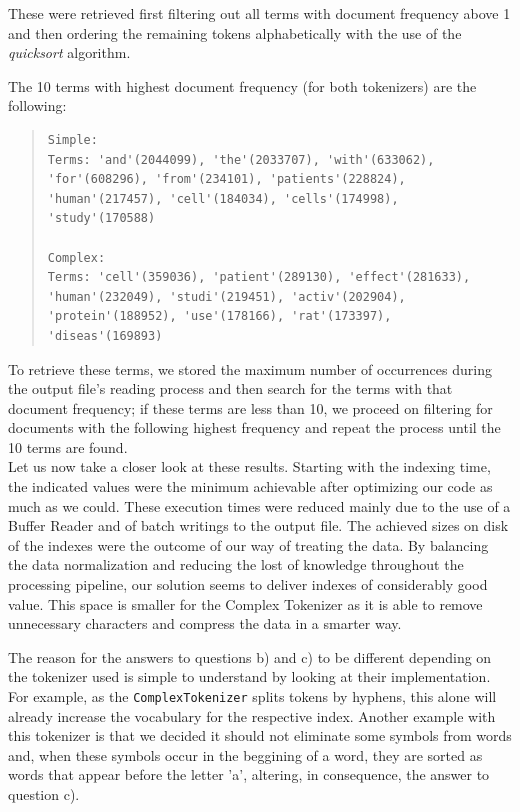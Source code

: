 \documentclass[12pt]{article}
\begin{document}
These were retrieved first filtering out all terms with document frequency
above 1 and then ordering the remaining tokens alphabetically with the use 
of the {\it quicksort\/} algorithm.

\newpage
The 10 terms with highest document frequency (for both tokenizers) are the 
following:

\begingroup
\addtolength\leftmargini{-0.4in}
\addtolength\baselineskip{-0.05in}
\begin{quote}
\begin{verbatim}
Simple:
Terms: 'and'(2044099), 'the'(2033707), 'with'(633062), 
'for'(608296), 'from'(234101), 'patients'(228824),
'human'(217457), 'cell'(184034), 'cells'(174998),
'study'(170588)

Complex:
Terms: 'cell'(359036), 'patient'(289130), 'effect'(281633),
'human'(232049), 'studi'(219451), 'activ'(202904),
'protein'(188952), 'use'(178166), 'rat'(173397),
'diseas'(169893)
\end{verbatim}
\end{quote}
\endgroup

To retrieve these terms, we stored the maximum number of occurrences
during the output file's reading process and then search for the terms
with that document frequency; if these terms are less than 10, we proceed 
on filtering for documents with the following highest frequency
and repeat the process until the 10 terms are found. \\

Let us now take a closer look at these results.
Starting with the indexing time, the indicated values were the minimum
achievable after optimizing our code as much as we could.
These execution times were reduced mainly due to the use of a Buffer Reader
and of batch writings to the output file.
The achieved sizes on disk of the indexes were the outcome of our way of 
treating the data. 
By balancing the data normalization and reducing the lost of 
knowledge throughout the processing pipeline, our solution seems to 
deliver indexes of considerably good value.
This space is smaller for the Complex Tokenizer as it is able to remove
unnecessary characters and compress the data in a smarter way.

The reason for the answers to questions b) and c) to be different depending on 
the tokenizer used is simple to understand by looking at their implementation.
For example, as the \texttt{ComplexTokenizer} splits tokens by hyphens, this
alone will already increase the vocabulary for the respective index.
Another example with this tokenizer is that we decided it should not eliminate
some symbols from words and, when these symbols occur in the beggining of a 
word, they are sorted as words that appear before the letter 'a', altering,
in consequence, the answer to question c).
\end{document}
